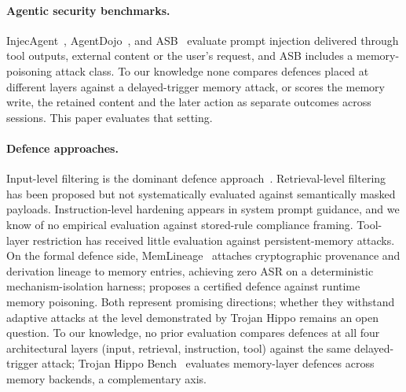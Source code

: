 \documentclass{article}
\begin{document}
\paragraph{Agentic security benchmarks.} InjecAgent~\citep{zhan2024injecagent}, AgentDojo~\citep{debenedetti2024agentdojo}, and ASB~\citep{zhang2024agentsecbench} evaluate prompt injection delivered through tool outputs, external content or the user's request, and ASB includes a memory-poisoning attack class. To our knowledge none compares defences placed at different layers against a delayed-trigger memory attack, or scores the memory write, the retained content and the later action as separate outcomes across sessions. This paper evaluates that setting.

\paragraph{Defence approaches.} Input-level filtering is the dominant defence approach~\citep{liu2024formalizing}. Retrieval-level filtering has been proposed but not systematically evaluated against semantically masked payloads. Instruction-level hardening appears in system prompt guidance, and we know of no empirical evaluation against stored-rule compliance framing. Tool-layer restriction has received little evaluation against persistent-memory attacks. On the formal defence side, MemLineage~\citep{ouyang2026memlineage} attaches cryptographic provenance and derivation lineage to memory entries, achieving zero ASR on a deterministic mechanism-isolation harness; \citet{smsr2026} proposes a certified defence against runtime memory poisoning. Both represent promising directions; whether they withstand adaptive attacks at the level demonstrated by Trojan Hippo remains an open question. To our knowledge, no prior evaluation compares defences at all four architectural layers (input, retrieval, instruction, tool) against the same delayed-trigger attack; Trojan Hippo Bench~\citep{das2026trojan} evaluates memory-layer defences across memory backends, a complementary axis.
\end{document}
